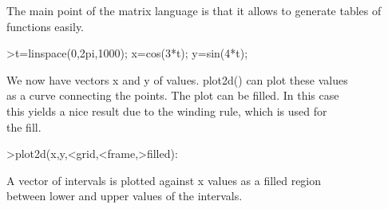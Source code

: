 \documentclass{article}
\begin{document}
\begin{eulernotebook}
\begin{eulercomment}
\begin{eulercomment}
\begin{eulercomment}
\begin{eulercomment}
\begin{eulercomment}
\begin{eulercomment}
\begin{eulercomment}
The main point of the matrix language is that it allows to generate tables of
functions easily.
\end{eulercomment}
\begin{eulerprompt}
>t=linspace(0,2pi,1000); x=cos(3*t); y=sin(4*t);
\end{eulerprompt}
\begin{eulercomment}
We now have vectors x and y of values. plot2d() can plot these values\\
as a curve connecting the points. The plot can be filled. In this case\\
this yields a nice result due to the winding rule, which is used for\\
the fill.
\end{eulercomment}
\begin{eulerprompt}
>plot2d(x,y,<grid,<frame,>filled):
\end{eulerprompt}
\begin{eulercomment}
A vector of intervals is plotted against x values as a filled region\\
between lower and upper values of the intervals.


\end{eulercomment}
\end{eulercomment}
\end{eulercomment}
\end{eulercomment}
\end{eulercomment}
\end{eulercomment}
\end{eulercomment}
\end{eulernotebook}
\end{document}
